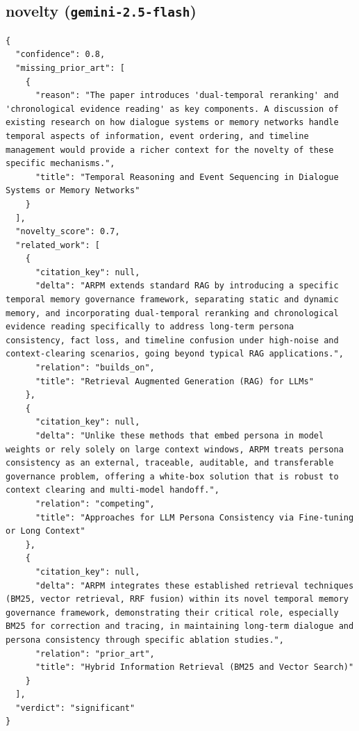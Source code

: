 \documentclass[11pt]{article}
\begin{document}
\subsection*{novelty (\texttt{gemini-2.5-flash})}
\begin{verbatim}
{
  "confidence": 0.8,
  "missing_prior_art": [
    {
      "reason": "The paper introduces 'dual-temporal reranking' and 'chronological evidence reading' as key components. A discussion of existing research on how dialogue systems or memory networks handle temporal aspects of information, event ordering, and timeline management would provide a richer context for the novelty of these specific mechanisms.",
      "title": "Temporal Reasoning and Event Sequencing in Dialogue Systems or Memory Networks"
    }
  ],
  "novelty_score": 0.7,
  "related_work": [
    {
      "citation_key": null,
      "delta": "ARPM extends standard RAG by introducing a specific temporal memory governance framework, separating static and dynamic memory, and incorporating dual-temporal reranking and chronological evidence reading specifically to address long-term persona consistency, fact loss, and timeline confusion under high-noise and context-clearing scenarios, going beyond typical RAG applications.",
      "relation": "builds_on",
      "title": "Retrieval Augmented Generation (RAG) for LLMs"
    },
    {
      "citation_key": null,
      "delta": "Unlike these methods that embed persona in model weights or rely solely on large context windows, ARPM treats persona consistency as an external, traceable, auditable, and transferable governance problem, offering a white-box solution that is robust to context clearing and multi-model handoff.",
      "relation": "competing",
      "title": "Approaches for LLM Persona Consistency via Fine-tuning or Long Context"
    },
    {
      "citation_key": null,
      "delta": "ARPM integrates these established retrieval techniques (BM25, vector retrieval, RRF fusion) within its novel temporal memory governance framework, demonstrating their critical role, especially BM25 for correction and tracing, in maintaining long-term dialogue and persona consistency through specific ablation studies.",
      "relation": "prior_art",
      "title": "Hybrid Information Retrieval (BM25 and Vector Search)"
    }
  ],
  "verdict": "significant"
}
\end{verbatim}
\end{document}
